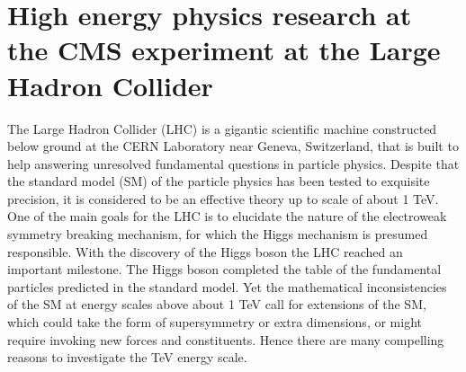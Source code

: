 \section{High energy physics research at the CMS 
     experiment at the Large Hadron Collider}


The Large Hadron Collider (LHC) is a gigantic scientific machine constructed 
below ground at the CERN Laboratory near Geneva, Switzerland, 
that is built to help answering unresolved fundamental questions in particle physics. 
Despite that the standard model (SM) of the particle physics has been tested 
to exquisite precision, it is considered to be an effective theory up to scale of about 1 TeV. 
One of the main goals for the LHC is to elucidate the nature of the electroweak symmetry
breaking mechanism, for which the Higgs mechanism is presumed responsible. 
With the discovery of the Higgs boson the LHC reached an important milestone.
The Higgs boson completed the table of the fundamental particles predicted
in the standard model. Yet the mathematical inconsistencies of the SM at energy 
scales above about 1 TeV call for extensions of the SM, which could take the form 
of supersymmetry or extra dimensions, or might require invoking new forces and 
constituents. Hence there are many compelling reasons to investigate the TeV energy scale.

